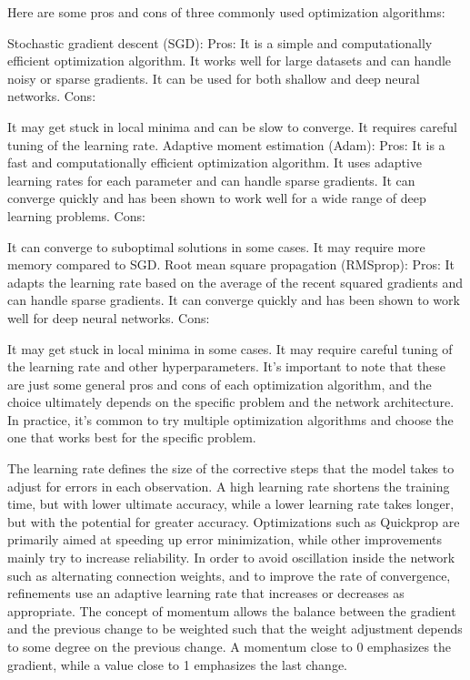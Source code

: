 Here are some pros and cons of three commonly used optimization algorithms:

Stochastic gradient descent (SGD):
Pros:
It is a simple and computationally efficient optimization algorithm.
It works well for large datasets and can handle noisy or sparse gradients.
It can be used for both shallow and deep neural networks.
Cons:

It may get stuck in local minima and can be slow to converge.
It requires careful tuning of the learning rate.
Adaptive moment estimation (Adam):
Pros:
It is a fast and computationally efficient optimization algorithm.
It uses adaptive learning rates for each parameter and can handle sparse gradients.
It can converge quickly and has been shown to work well for a wide range of deep learning problems.
Cons:

It can converge to suboptimal solutions in some cases.
It may require more memory compared to SGD.
Root mean square propagation (RMSprop):
Pros:
It adapts the learning rate based on the average of the recent squared gradients and can handle sparse gradients.
It can converge quickly and has been shown to work well for deep neural networks.
Cons:

It may get stuck in local minima in some cases.
It may require careful tuning of the learning rate and other hyperparameters.
It's important to note that these are just some general pros and cons of each optimization algorithm, and the choice ultimately depends on the specific problem and the network architecture. In practice, it's common to try multiple optimization algorithms and choose the one that works best for the specific problem.

The learning rate defines the size of the corrective steps that the model takes to adjust for errors in each observation. A high learning rate shortens the training time, but with lower ultimate accuracy, while a lower learning rate takes longer, but with the potential for greater accuracy. Optimizations such as Quickprop are primarily aimed at speeding up error minimization, while other improvements mainly try to increase reliability. In order to avoid oscillation inside the network such as alternating connection weights, and to improve the rate of convergence, refinements use an adaptive learning rate that increases or decreases as appropriate. The concept of momentum allows the balance between the gradient and the previous change to be weighted such that the weight adjustment depends to some degree on the previous change. A momentum close to 0 emphasizes the gradient, while a value close to 1 emphasizes the last change.

